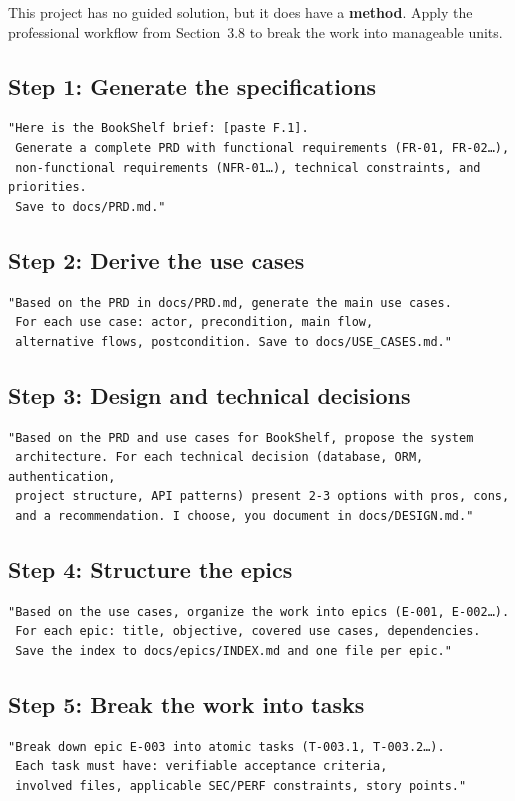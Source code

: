 This project has no guided solution, but it does have a \textbf{method}. Apply the professional workflow from Section~3.8 to break the work into manageable units.

\subsection{Step 1: Generate the specifications}
\begin{lstlisting}[language={}]
"Here is the BookShelf brief: [paste F.1].
 Generate a complete PRD with functional requirements (FR-01, FR-02…),
 non-functional requirements (NFR-01…), technical constraints, and priorities.
 Save to docs/PRD.md."
\end{lstlisting}

\subsection{Step 2: Derive the use cases}
\begin{lstlisting}[language={}]
"Based on the PRD in docs/PRD.md, generate the main use cases.
 For each use case: actor, precondition, main flow,
 alternative flows, postcondition. Save to docs/USE_CASES.md."
\end{lstlisting}

\subsection{Step 3: Design and technical decisions}
\begin{lstlisting}[language={}]
"Based on the PRD and use cases for BookShelf, propose the system
 architecture. For each technical decision (database, ORM, authentication,
 project structure, API patterns) present 2-3 options with pros, cons,
 and a recommendation. I choose, you document in docs/DESIGN.md."
\end{lstlisting}

\subsection{Step 4: Structure the epics}
\begin{lstlisting}[language={}]
"Based on the use cases, organize the work into epics (E-001, E-002…).
 For each epic: title, objective, covered use cases, dependencies.
 Save the index to docs/epics/INDEX.md and one file per epic."
\end{lstlisting}

\subsection{Step 5: Break the work into tasks}
\begin{lstlisting}[language={}]
"Break down epic E-003 into atomic tasks (T-003.1, T-003.2…).
 Each task must have: verifiable acceptance criteria,
 involved files, applicable SEC/PERF constraints, story points."
\end{lstlisting}

